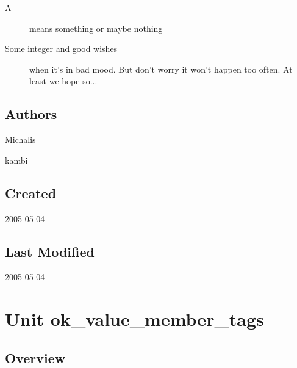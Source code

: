\documentclass{report}
\begin{document}
\begin{list}{}
  \par
\item[\textbf{Parameters}]
\begin{description}
\item[A] means something or maybe nothing
\end{description}
\item[\textbf{Returns}]Some integer and good wishes
\item[\textbf{Exceptions}]
\begin{description}
\item[\begin{ttfamily}EBar\end{ttfamily}(\ref{ok_expanding_descriptions.EBar})] when it's in bad mood. But don't worry it won't happen too often. At least we hope so...
\end{description}


\end{list}
\section{Authors}
\par
Michalis

\par
kambi

\section{Created}
\par
2005{-}05{-}04


\section{Last Modified}
\par
2005{-}05{-}04


\chapter{Unit ok{\_}value{\_}member{\_}tags}
\label{ok_value_member_tags}
\section{Overview}
\begin{description}
\item[\texttt{\begin{ttfamily}TMyClass\end{ttfamily} Class}]  
\item[\texttt{\begin{ttfamily}TMyRecord\end{ttfamily} Record}]
\end{description}
\end{document}
